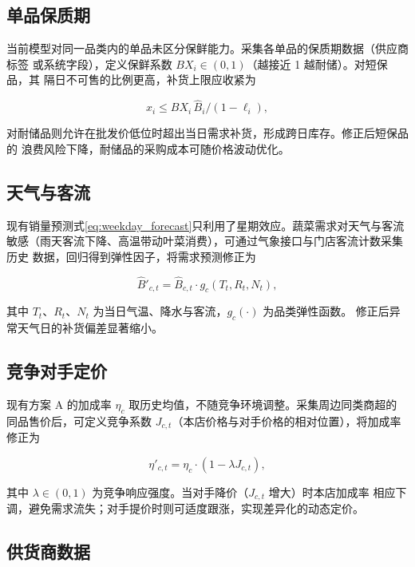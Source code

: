 \subsection{单品保质期}

当前模型对同一品类内的单品未区分保鲜能力。采集各单品的保质期数据（供应商标签
或系统字段），定义保鲜系数 $BX_i\in(0,1)$（越接近 1 越耐储）。对短保品，其
隔日不可售的比例更高，补货上限应收紧为

\begin{equation}
x_i\le BX_i\,\hat B_i/(1-\ell_i),
\label{eq:q4_bx}
\end{equation}

对耐储品则允许在批发价低位时超出当日需求补货，形成跨日库存。修正后短保品的
浪费风险下降，耐储品的采购成本可随价格波动优化。

\subsection{天气与客流}

现有销量预测式\eqref{eq:weekday_forecast}只利用了星期效应。蔬菜需求对天气与客流
敏感（雨天客流下降、高温带动叶菜消费），可通过气象接口与门店客流计数采集历史
数据，回归得到弹性因子，将需求预测修正为

\begin{equation}
\hat B'_{c,t}=\hat B_{c,t}\cdot g_c(T_t,R_t,N_t),
\label{eq:q4_weather}
\end{equation}

其中 $T_t$、$R_t$、$N_t$ 为当日气温、降水与客流，$g_c(\cdot)$ 为品类弹性函数。
修正后异常天气日的补货偏差显著缩小。

\subsection{竞争对手定价}

现有方案 A 的加成率 $\eta_c$ 取历史均值，不随竞争环境调整。采集周边同类商超的
同品售价后，可定义竞争系数 $J_{c,t}$（本店价格与对手价格的相对位置），将加成率
修正为

\begin{equation}
\eta'_{c,t}=\eta_c\cdot(1-\lambda J_{c,t}),
\label{eq:q4_comp}
\end{equation}

其中 $\lambda\in(0,1)$ 为竞争响应强度。当对手降价（$J_{c,t}$ 增大）时本店加成率
相应下调，避免需求流失；对手提价时则可适度跟涨，实现差异化的动态定价。

\subsection{供货商数据}

